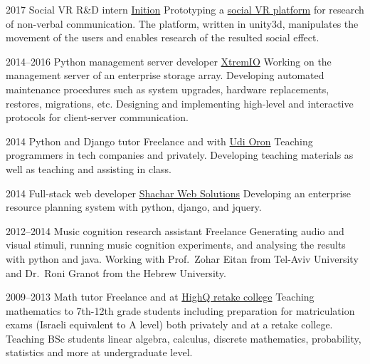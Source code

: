 \documentclass[]{friggeri-cv}
\begin{document}
\begin{entrylist}

    \entry
    {2017}
    {Social VR R\&D intern}
    {\href{https://www.inition.co.uk/}{Inition}}
    {
      Prototyping a \href{https://github.com/Nagasaki45/UnsocialVR/}{social VR platform} for research of non-verbal communication. The platform, written in unity3d, manipulates the movement of the users and enables research of the resulted social effect.
    }

\end{entrylist}
\begin{entrylist}

    \entry
    {2014--2016}
    {Python management server developer}
    {\href{http://xtremio.com/}{XtremIO}}
    {
      Working on the management server of an enterprise storage array.
      Developing automated maintenance procedures such as system upgrades, hardware replacements, restores, migrations, etc.
      Designing and implementing high-level and interactive protocols for client-server communication.
    }

\end{entrylist}
\begin{entrylist}

    \entry
    {2014}
    {Python and Django tutor}
    {Freelance and with \href{http://www.10x.org.il/}{Udi Oron}}
    {
      Teaching programmers in tech companies and privately.
      Developing teaching materials as well as teaching and assisting in class.
    }

\end{entrylist}
\begin{entrylist}

    \entry
    {2014}
    {Full-stack web developer}
    {\href{http://www.shachar-web.co.il/eng/}{Shachar Web Solutions}}
    {
      Developing an enterprise resource planning system with python, django, and jquery.
    }

\end{entrylist}
\begin{entrylist}

    \entry
    {2012--2014}
    {Music cognition research assistant}
    {Freelance}
    {
      Generating audio and visual stimuli, running music cognition experiments, and analysing the results with python and java.
      Working with Prof.\ Zohar Eitan from Tel-Aviv University and Dr.\ Roni Granot from the Hebrew University.
    }

\end{entrylist}
\begin{entrylist}

    \entry
    {2009--2013}
    {Math tutor}
    {Freelance and at \href{https://www.high-q.co.il/}{HighQ retake college}}
    {
      Teaching mathematics to 7th-12th grade students including preparation for matriculation exams (Israeli equivalent to A level) both privately and at a retake college.
      Teaching BSc students linear algebra, calculus, discrete mathematics, probability, statistics and more at undergraduate level.
    }

\end{entrylist}
\end{document}
